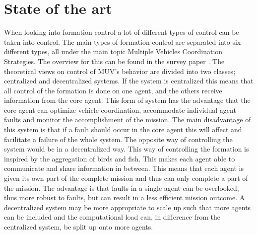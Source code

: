 \section{State of the art}
When looking into formation control a lot of different types of control can be taken into control. The main types of formation control are separated into six different types, all under the main topic Multiple Vehicles Coordination Strategies. The overview for this can be found in the survey paper \cite{muv-survey}. The theoretical views on control of \ac{MUV}'s behavior are divided into two classes; centralized and decentralized systems. If the system is centralized this means that all control of the formation is done on one agent, and the others receive information from the core agent. This form of system has the advantage that the core agent can optimize vehicle coordination, accommodate individual agent faults and monitor the accomplishment of the mission. The main disadvantage of this system is that if a fault should occur in the core agent this will affect and facilitate a failure of the whole system. The opposite way of controlling the system would be in a decentralized way. This way of controlling the formation is inspired by the aggregation of birds and fish. This makes each agent able to communicate and share information in between. This means that each agent is given its own part of the complete mission and thus can only complete a part of the mission. The advantage is that faults in a single agent can be overlooked, thus more robust to faults, but can result in a less efficient mission outcome. A decentralized system may be more appropriate to scale up such that more agents can be included and the computational load can, in difference from the centralized system, be split up onto more agents.

